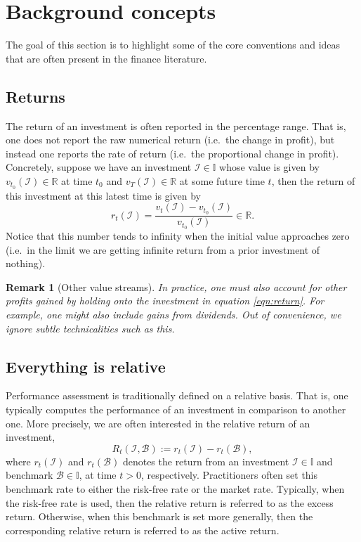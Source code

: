 \documentclass[12pt]{article}
\newtheorem{remark}{Remark}[section]
\begin{document}
\section{Background concepts}
The goal of this section is to highlight some of the core conventions and ideas that are often present in the finance literature.
\subsection{Returns}
The return of an investment is often reported in the percentage range. That is, one does not report the raw numerical return (i.e.\ the change in profit), but instead one reports the rate of return (i.e.\ the proportional change in profit). Concretely, suppose we have an investment $\mathcal{I} \in \mathbb{I}$ whose value is given by $v_{t_0}(\mathcal{I}) \in \mathbb{R}$ at time $t_0$ and $v_T(\mathcal{I}) \in \mathbb{R}$ at some future time $t$, then the return of this investment at this latest time is given by
\begin{equation}
    r_t(\mathcal{I}) = \frac{v_t(\mathcal{I}) - v_{t_0}(\mathcal{I})}{v_{t_0}(\mathcal{I})} \in \mathbb{R}.
    \label{eqn:return}
\end{equation}
Notice that this number tends to infinity when the initial value approaches zero (i.e.\ in the limit we are getting infinite return from a prior investment of nothing).

\begin{remark}
	[Other value streams] In practice, one must also account for other profits gained by holding onto the investment in equation \eqref{eqn:return}. For example, one might also include gains from dividends. Out of convenience, we ignore subtle technicalities such as this.
\end{remark}

\subsection{Everything is relative}
Performance assessment is traditionally defined on a relative basis. That is, one typically computes the performance of an investment in comparison to another one. More precisely, we are often interested in the relative return of an investment,
\begin{equation}
    R_t(\mathcal{I}, \mathcal{B}) := r_t(\mathcal{I}) - r_t(\mathcal{B}),
    \label{eqn:relative_return}
\end{equation}
where $r_t(\mathcal{I})$ and $r_t(\mathcal{B})$ denotes the return from an investment $\mathcal{I} \in \mathbb{I}$ and benchmark $\mathcal{B} \in \mathbb{I}$, at time $t > 0$, respectively. Practitioners often set this benchmark rate to either the risk-free rate or the market rate. Typically, when the risk-free rate is used, then the relative return is referred to as the excess return. Otherwise, when this benchmark is set more generally, then the corresponding relative return is referred to as the active return.
\end{document}
